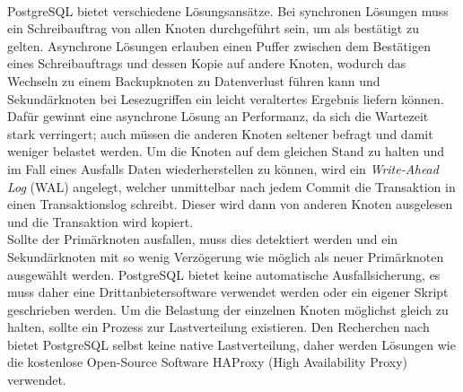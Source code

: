 \paragraph{}
PostgreSQL bietet verschiedene Lösungsansätze. Bei synchronen Lösungen muss ein Schreibauftrag von allen Knoten durchgeführt sein, um als bestätigt zu gelten. Asynchrone Lösungen erlauben einen Puffer zwischen dem Bestätigen eines Schreibauftrags und dessen Kopie auf andere Knoten, wodurch das Wechseln zu einem Backupknoten zu Datenverlust führen kann und Sekundärknoten bei Lesezugriffen ein leicht veraltertes Ergebnis liefern können. Dafür gewinnt eine asynchrone Lösung an Performanz, da sich die Wartezeit stark verringert; auch müssen die anderen Knoten seltener befragt und damit weniger belastet werden. Um die Knoten auf dem gleichen Stand zu halten und im Fall eines Ausfalls Daten wiederherstellen zu können, wird ein \textit{Write-Ahead Log} (WAL) angelegt, welcher unmittelbar nach jedem Commit die Transaktion in einen Transaktionslog schreibt. Dieser wird dann von anderen Knoten ausgelesen und die Transaktion wird kopiert. \cite{PG1}\\
Sollte der Primärknoten ausfallen, muss dies detektiert werden und ein Sekundärknoten mit so wenig Verzögerung wie möglich als neuer Primärknoten ausgewählt werden. PostgreSQL bietet keine automatische Ausfallsicherung, es muss daher eine Drittanbietersoftware verwendet werden oder ein eigener Skript geschrieben werden. Um die Belastung der einzelnen Knoten möglichst gleich zu halten, sollte ein Prozess zur Lastverteilung existieren. Den Recherchen nach bietet PostgreSQL selbst keine native Lastverteilung, daher werden Lösungen wie die kostenlose Open-Source Software HAProxy (High Availability Proxy) verwendet.

